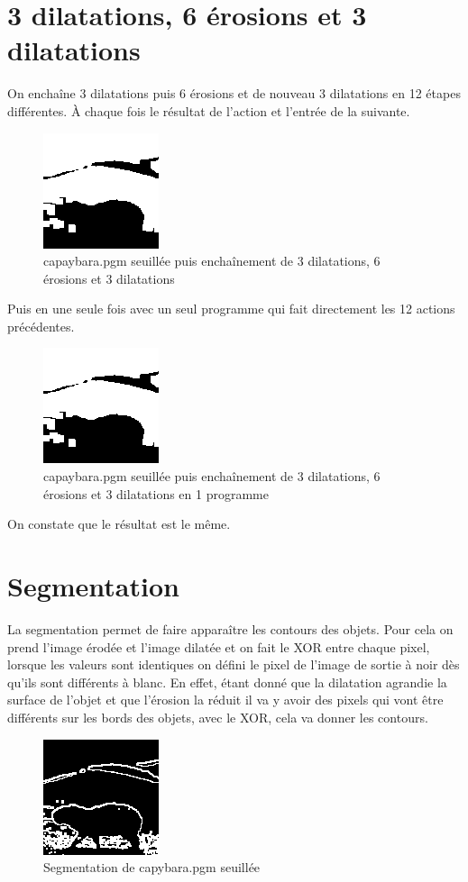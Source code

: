 \documentclass{article}
\begin{document}
\newpage
\section{3 dilatations, 6 érosions et 3 dilatations}
On enchaîne 3 dilatations puis 6 érosions et de nouveau 3 dilatations en 12 étapes différentes.
À chaque fois le résultat de l'action et l'entrée de la suivante.
\begin{figure}[h]
\centerline{\includegraphics[scale=1.4]{./rendus/capybatap363.png}}
\caption{capaybara.pgm seuillée puis enchaînement de 3 dilatations, 6 érosions et 3 dilatations}
\end{figure}

Puis en une seule fois avec un seul programme qui fait directement les 12 actions précédentes.
\begin{figure}[h]
\centerline{\includegraphics[scale=1.4]{./rendus/capybatap363.png}}
\caption{capaybara.pgm seuillée puis enchaînement de 3 dilatations, 6 érosions et 3 dilatations en 1 programme}
\end{figure}

On constate que le résultat est le même.

\newpage
\section{Segmentation}
La segmentation permet de faire apparaître les contours des objets.
Pour cela on prend l'image érodée et l'image dilatée et on fait le XOR entre chaque pixel, lorsque les valeurs sont identiques on défini le pixel de l'image de sortie à noir dès qu'ils sont différents à blanc.
En effet, étant donné que la dilatation agrandie la surface de l'objet  et que l'érosion la réduit il va y avoir des pixels qui vont être différents sur les bords des objets, avec le XOR, cela va donner les contours.
 \begin{figure}[h]
\centerline{\includegraphics[scale=1.4]{./rendus/capybatapSegment.png}}
\caption{Segmentation de capybara.pgm seuillée} 
\end{figure}
\end{document}

